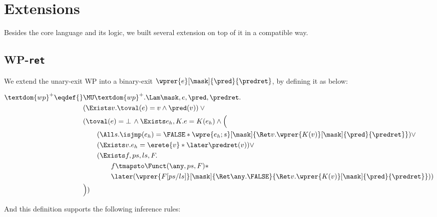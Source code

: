 \section{Extensions}\label{sec:extension}


Besides the core language and its logic,
we built several extension on top of it in a compatible way.

\subsection{WP-\texttt{ret}}\label{def:wpr}

We extend the unary-exit WP into a binary-exit $\wprer{e}[\mask]{\pred}{\predret}$,
by defining it as below:

\begin{align*}
  \textdom{wp}^{+} \eqdef{}& \MU \textdom{wp}^{+}. \Lam \mask, e, \pred, \predret. \\
        & (\Exists v. \toval(e) = v \land \pred(v)) \lor {}\\
        & (\toval(e) = \bot \,\land \Exists e_h, K. e = K(e_h) \land \Bigl({}\\
        &\qquad (\All s. \isjmp(e_h) = \FALSE * \wpre{e_h; s}[\mask]{\Ret v. \wprer{K(v)}[\mask]{\pred}{\predret}}) \lor \\
        &\qquad (\Exists v. e_h = \erete{v} * \later \predret(v)) \lor \\
        &\qquad (\Exists f, ps, ls, F. \\
                           & \qquad \qquad f \tmapsto \Funct(\any, ps, F) * \\
                           & \qquad \qquad \later (\wprer{F[ps/ls]}[\mask]{\Ret\any.\FALSE}{\Ret v.
                             \wprer{K(v)}[\mask]{\pred}{\predret}})) \\
        &\Bigr) )\\
\end{align*}

And this definition supports the following inference rules:

